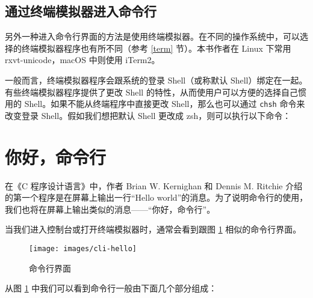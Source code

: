 \documentclass[]{ctexbook}
\newenvironment{Shaded}{\begin{snugshade}}{\end{snugshade}}
\newcommand{\ExtensionTok}[1]{#1}
\newcommand{\NormalTok}[1]{#1}
\begin{document}
\hypertarget{ux901aux8fc7ux7ec8ux7aefux6a21ux62dfux5668ux8fdbux5165ux547dux4ee4ux884c}{%
\subsection{通过终端模拟器进入命令行}\label{ux901aux8fc7ux7ec8ux7aefux6a21ux62dfux5668ux8fdbux5165ux547dux4ee4ux884c}}

另外一种进入命令行界面的方法是使用终端模拟器。在不同的操作系统中，可以选择的终端模拟器程序也有所不同（参考 \ref{term} 节）。本书作者在 Linux 下常用 rxvt-unicode，macOS 中则使用 iTerm2。

一般而言，终端模拟器程序会跟系统的登录 Shell（或称默认 Shell）绑定在一起。有些终端模拟器程序提供了更改 Shell 的特性，从而使用户可以方便的选择自己惯用的 Shell。如果不能从终端程序中直接更改 Shell，那么也可以通过 \texttt{chsh} 命令来改变登录 Shell。假如我们想把默认 Shell 更改成 zsh，则可以执行以下命令：

\begin{Shaded}
\end{Shaded}

\hypertarget{ux4f60ux597dux547dux4ee4ux884c}{%
\section{你好，命令行}\label{ux4f60ux597dux547dux4ee4ux884c}}

在《C 程序设计语言》中，作者 Brian W. Kernighan 和 Dennis M. Ritchie 介绍的第一个程序是在屏幕上输出一行``Hello world''的消息。为了说明命令行的使用，我们也将在屏幕上输出类似的消息------``你好，命令行''。

当我们进入控制台或打开终端模拟器时，通常会看到跟图 \ref{fig:cli-prompt} 相似的命令行界面。

\begin{figure}
\texttt{[image: images/cli-hello]} \caption{命令行界面}\label{fig:cli-prompt}
\end{figure}

从图 \ref{fig:cli-prompt} 中我们可以看到命令行一般由下面几个部分组成：
\end{document}
